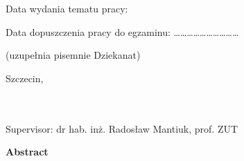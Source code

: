 \begin{titlepage}
\begin{center}
 \end{center}
  
 \vspace{1.cm}Data wydania tematu pracy:  \hspace{2.6cm} 

 \vspace{1 cm}
Data dopuszczenia pracy do egzaminu:	\hspace{1cm}…………………………

(uzupełnia pisemnie Dziekanat)

\begin{center}
   \vspace{1.0 cm}
   {\large Szczecin, }
   \vfill                         %
\end{center}

\end{titlepage}


\pagebreak

\begin{titlepage}

\begin{center}
\vspace{2.cm}                   
\LARGE {} \\ 
\vspace{1cm}                   
\large {}\\
\large Supervisor: dr hab. inż. Radosław Mantiuk, prof. ZUT\\
\vspace{1cm}
\end{center}

\textbf{Abstract}
\vspace{12pt}
 

\end{titlepage}

\pagebreak

